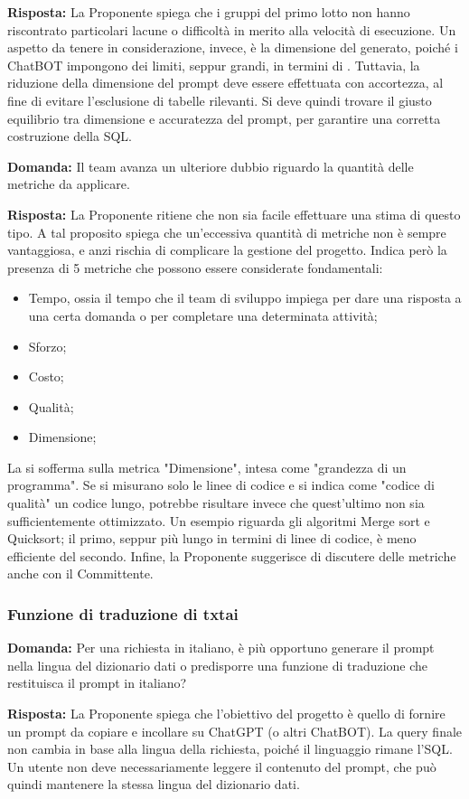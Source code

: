 \par \textbf{Risposta:} La Proponente spiega che i gruppi del primo lotto non hanno riscontrato particolari lacune o difficoltà in merito alla velocità di esecuzione. Un aspetto da tenere in considerazione, invece, è la dimensione del  generato, poiché i ChatBOT impongono dei limiti, seppur grandi, in termini di .
Tuttavia, la riduzione della dimensione del prompt deve essere effettuata con accortezza, al fine di evitare l'esclusione di tabelle rilevanti. Si deve quindi trovare il giusto equilibrio tra dimensione e accuratezza del prompt, per garantire una corretta costruzione della  SQL.

\par \textbf{Domanda:} Il team avanza un ulteriore dubbio riguardo la quantità delle metriche da applicare.

\par \textbf{Risposta:} La Proponente ritiene che non sia facile effettuare una stima di questo tipo. A tal proposito spiega che un'eccessiva quantità di metriche non è sempre vantaggiosa, e anzi rischia di complicare la gestione del progetto. Indica però la presenza di 5 metriche che possono essere considerate fondamentali:
\begin{itemize}
	\item Tempo, ossia il tempo che il team di sviluppo impiega per dare una risposta a una certa domanda o per completare una determinata attività;
	\item Sforzo;
	\item Costo;
	\item Qualità;
	\item Dimensione;
\end{itemize}
La  si sofferma sulla metrica "Dimensione", intesa come "grandezza di un programma". Se si misurano solo le linee di codice e si indica come "codice di qualità" un codice lungo, potrebbe risultare invece che quest'ultimo non sia sufficientemente ottimizzato. Un esempio riguarda gli algoritmi Merge sort e Quicksort; il primo, seppur più lungo in termini di linee di codice, è meno efficiente del secondo. Infine, la Proponente suggerisce di discutere delle metriche anche con il Committente.

\subsubsection{Funzione di traduzione di txtai}
\par \textbf{Domanda:} Per una richiesta in italiano, è più opportuno generare il prompt nella lingua del dizionario dati o predisporre una funzione di traduzione che restituisca il prompt in italiano?

\par \textbf{Risposta:} La Proponente spiega che l'obiettivo del progetto è quello di fornire un prompt da copiare e incollare su ChatGPT (o altri ChatBOT). La query finale non cambia in base alla lingua della richiesta, poiché il linguaggio rimane l'SQL. Un utente non deve necessariamente leggere il contenuto del prompt, che può quindi mantenere la stessa lingua del dizionario dati.
